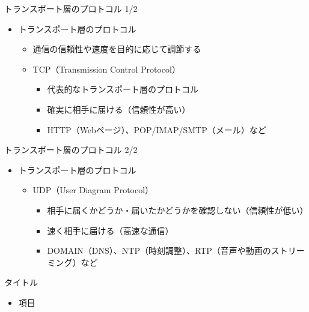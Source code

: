 \documentclass[12pt,aspectratio=169]{beamer}
\begin{document}
\begin{frame}{トランスポート層のプロトコル 1/2}

  \begin{itemize}
    \item トランスポート層のプロトコル
      \begin{itemize}
        \item 通信の信頼性や速度を目的に応じて調節する
        \item TCP（Transmission Control Protocol）
          \begin{itemize}
            \item 代表的なトランスポート層のプロトコル
            \item 確実に相手に届ける（信頼性が高い）
            \item HTTP（Webページ）、POP/IMAP/SMTP（メール）など
          \end{itemize}

      \end{itemize}
  \end{itemize}

\end{frame}


\begin{frame}{トランスポート層のプロトコル 2/2}

  \begin{itemize}
    \item トランスポート層のプロトコル
      \begin{itemize}
        \item UDP（User Diagram Protocol）
          \begin{itemize}
            \item 相手に届くかどうか・届いたかどうかを確認しない（信頼性が低い）
            \item 速く相手に届ける（高速な通信）
            \item DOMAIN（DNS）、NTP（時刻調整）、RTP（音声や動画のストリーミング）など
          \end{itemize}

      \end{itemize}
  \end{itemize}

\end{frame}


\begin{frame}{タイトル}

  \begin{itemize}
    \item 項目

  \end{itemize}

\end{frame}
\end{document}

